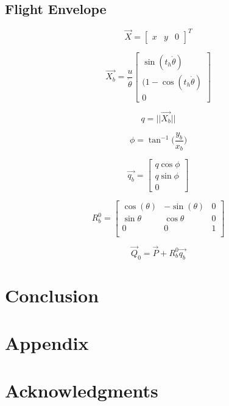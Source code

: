 \documentclass[conf]{new-aiaa}
\begin{document}
\subsection{Flight Envelope}

\begin{equation}
\label{eq:pos}
\overrightarrow{X} = \begin{bmatrix}
x & y & 0
\end{bmatrix}^T
\end{equation}


\begin{equation}
\label{eq:pos}
\overrightarrow{X_b} = \frac{u}{\dot{\theta}}\begin{bmatrix}
\sin(t_h \dot{\theta}) \\
(1-\cos(t_h \dot{\theta}) \\
0
\end{bmatrix}
\end{equation}

\begin{equation}
\label{eq:pos}
q = ||\overrightarrow{X_b}||
\end{equation}

\begin{equation}
\label{eq:pos}
\phi = \tan^{-1} \bigg( \frac{y_b}{x_b} \bigg)
\end{equation}

\begin{equation}
\label{eq:pos}
\overrightarrow{q_b} = \begin{bmatrix}
	q\cos\phi \\
	q\sin\phi \\
	0
\end{bmatrix}
\end{equation}

\begin{equation}
\label{eq:pos}
   R^0_b=\begin{bmatrix}
	\cos(\theta) & -\sin(\theta) & 0 \\
	\sin\theta & \cos\theta & 0 \\
	0 & 0 & 1 \\
\end{bmatrix}
\end{equation}


\begin{equation}
\label{eq:pos}
\overrightarrow{Q}_0 = \overrightarrow{P} + R^0_b  \overrightarrow{q_b}
\end{equation}
















\section{Conclusion}



\section*{Appendix}



\section*{Acknowledgments}


\end{document}
